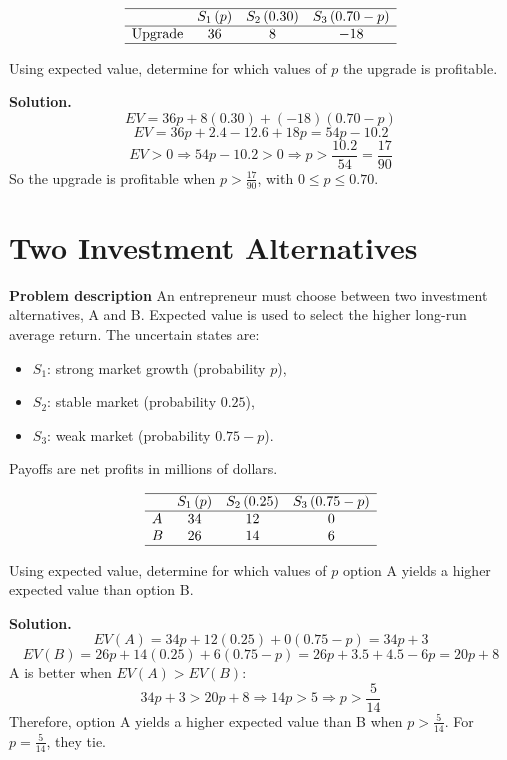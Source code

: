 \begin{ExamProblems}
		\[
		\begin{array}{lccc}
			\hline
			& S_1\,(p) & S_2\,(0.30) & S_3\,(0.70-p) \\
			\hline
			\text{Upgrade} & 36 & 8 & -18 \\
			\hline
		\end{array}
		\]
		
		Using expected value, determine for which values of \(p\) the upgrade is profitable.
		
		\textbf{Solution.}
		\[
		EV=36p+8(0.30)+(-18)(0.70-p)
		\]
		\[
		EV=36p+2.4-12.6+18p=54p-10.2
		\]
		\[
		EV>0\Rightarrow 54p-10.2>0\Rightarrow p>\frac{10.2}{54}=\frac{17}{90}
		\]
		So the upgrade is profitable when \(p>\frac{17}{90}\), with \(0\le p\le0.70\).
		
		
		\hypertarget{c7-cu-ex3}{}
		\item
		\section{Two Investment Alternatives}
		
		\textbf{Problem description}
		An entrepreneur must choose between two investment alternatives, A and B. Expected value is used to select the higher long-run average return. The uncertain states are:
		\begin{itemize}
			\item \(S_1\): strong market growth (probability \(p\)),
			\item \(S_2\): stable market (probability \(0.25\)),
			\item \(S_3\): weak market (probability \(0.75-p\)).
		\end{itemize}
		Payoffs are net profits in millions of dollars.
		
		\[
		\begin{array}{lccc}
			\hline
			& S_1\,(p) & S_2\,(0.25) & S_3\,(0.75-p) \\
			\hline
			A & 34 & 12 & 0 \\
			B & 26 & 14 & 6 \\
			\hline
		\end{array}
		\]
		
		Using expected value, determine for which values of \(p\) option A yields a higher expected value than option B.
		
		\textbf{Solution.}
		\[
		EV(A)=34p+12(0.25)+0(0.75-p)=34p+3
		\]
		\[
		EV(B)=26p+14(0.25)+6(0.75-p)=26p+3.5+4.5-6p=20p+8
		\]
		A is better when \(EV(A)>EV(B)\):
		\[
		34p+3>20p+8\Rightarrow 14p>5\Rightarrow p>\frac{5}{14}
		\]
		Therefore, option A yields a higher expected value than B when \(p>\frac{5}{14}\). For \(p=\frac{5}{14}\), they tie.
		

\end{ExamProblems}
